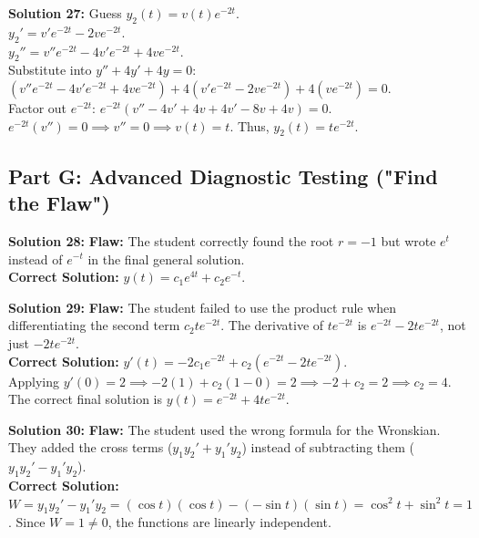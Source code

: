 \documentclass[11pt]{article}
\begin{document}
\textbf{Solution 27:} 
Guess $y_2(t) = v(t)e^{-2t}$. \\
$y_2' = v'e^{-2t} - 2ve^{-2t}$. \\
$y_2'' = v''e^{-2t} - 4v'e^{-2t} + 4ve^{-2t}$. \\
Substitute into $y'' + 4y' + 4y = 0$: \\
$(v''e^{-2t} - 4v'e^{-2t} + 4ve^{-2t}) + 4(v'e^{-2t} - 2ve^{-2t}) + 4(ve^{-2t}) = 0$. \\
Factor out $e^{-2t}$: $e^{-2t}(v'' - 4v' + 4v + 4v' - 8v + 4v) = 0$. \\
$e^{-2t}(v'') = 0 \implies v'' = 0 \implies v(t) = t$. Thus, $y_2(t) = te^{-2t}$.

\subsection*{Part G: Advanced Diagnostic Testing ("Find the Flaw")}

\textbf{Solution 28:} 
\textbf{Flaw:} The student correctly found the root $r = -1$ but wrote $e^t$ instead of $e^{-t}$ in the final general solution. \\
\textbf{Correct Solution:} $y(t) = c_1e^{4t} + c_2e^{-t}$.

\textbf{Solution 29:} 
\textbf{Flaw:} The student failed to use the product rule when differentiating the second term $c_2te^{-2t}$. The derivative of $te^{-2t}$ is $e^{-2t} - 2te^{-2t}$, not just $-2te^{-2t}$. \\
\textbf{Correct Solution:} $y'(t) = -2c_1e^{-2t} + c_2(e^{-2t} - 2te^{-2t})$. \\
Applying $y'(0) = 2 \implies -2(1) + c_2(1 - 0) = 2 \implies -2 + c_2 = 2 \implies c_2 = 4$. \\
The correct final solution is $y(t) = e^{-2t} + 4te^{-2t}$.

\textbf{Solution 30:} 
\textbf{Flaw:} The student used the wrong formula for the Wronskian. They added the cross terms ($y_1y_2' + y_1'y_2$) instead of subtracting them ($y_1y_2' - y_1'y_2$). \\
\textbf{Correct Solution:} $W = y_1y_2' - y_1'y_2 = (\cos t)(\cos t) - (-\sin t)(\sin t) = \cos^2 t + \sin^2 t = 1$. Since $W = 1 \neq 0$, the functions are linearly independent.

\newpage

\end{document}
